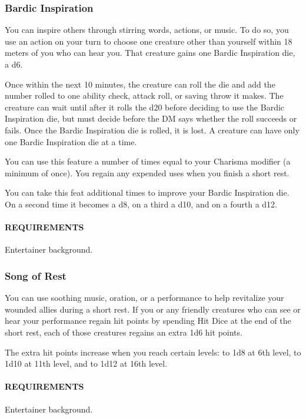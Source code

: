     \subsubsection{Bardic Inspiration} \label{feat::bardicinspiration}
        You can inspire others through stirring words, actions, or music.
        To do so, you use an action on your turn to choose one creature other than yourself within 18 meters of you who can hear you.
        That creature gains one Bardic Inspiration die, a d6.

        Once within the next 10 minutes, the creature can roll the die and add the number rolled to one ability check, attack roll, or saving throw it makes.
        The creature can wait until after it rolls the d20 before deciding to use the Bardic Inspiration die, but must decide before the DM says whether the roll succeeds or fails.
        Once the Bardic Inspiration die is rolled, it is lost.
        A creature can have only one Bardic Inspiration die at a time.

        You can use this feature a number of times equal to your Charisma modifier (a minimum of once).
        You regain any expended uses when you finish a short rest.

        You can take this feat additional times to improve your Bardic Inspiration die.
        On a second time it becomes a d8, on a third a d10, and on a fourth a d12.

        \paragraph{REQUIREMENTS} Entertainer background.

    \subsubsection{Song of Rest} \label{feat::songofrest}
        You can use soothing music, oration, or a performance to help revitalize your wounded allies during a short rest.
        If you or any friendly creatures who can see or hear your performance regain hit points by spending Hit Dice at the end of the short rest, each of those creatures regains an extra 1d6 hit points.

        The extra hit points increase when you reach certain levels: to 1d8 at 6th level, to 1d10 at 11th level, and to 1d12 at 16th level.
        \paragraph{REQUIREMENTS} Entertainer background.

